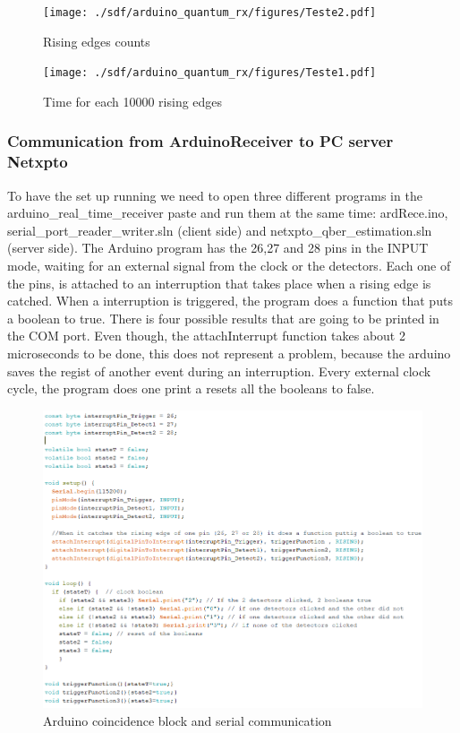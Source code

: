 \begin{refsection}
\begin{figure}[H]
	\centering
	\texttt{[image: ./sdf/arduino\_quantum\_rx/figures/Teste2.pdf]}
	\caption{Rising edges counts}
	\label{montage}
\end{figure}

\begin{figure}[H]
	\centering
	\texttt{[image: ./sdf/arduino\_quantum\_rx/figures/Teste1.pdf]}
	\caption{Time for each 10000 rising edges}
	\label{montage}
\end{figure}
	
	
	\subsubsection{Communication from ArduinoReceiver to PC server Netxpto}
	
To have the set up running we need to open three different programs in the arduino\_real\_time\_receiver paste and run them at the same time: ardRece.ino, serial\_port\_reader\_writer.sln (client side) and netxpto\_qber\_estimation.sln (server side).
The Arduino program has the 26,27 and 28 pins in the INPUT mode, waiting for an external signal from the clock or the detectors. Each one of the pins, is attached to an interruption that takes place when a rising edge is catched. When a interruption is triggered, the program does a function that puts a boolean to true. There is four possible results that are going to be printed in the COM port.
Even though, the attachInterrupt function takes about 2 microseconds to be done, this does not represent a problem, because the arduino saves the regist of another event during an interruption.
Every external clock cycle, the program does one print a resets all the booleans to false.

\begin{figure}[H]
	\centering
	\includegraphics[width=0.85\linewidth]{./sdf/arduino_quantum_rx/figures/arduinoComPC.PNG}
	\caption{Arduino coincidence block and serial communication}
	\label{montage}
	

\end{figure}
\end{refsection}
